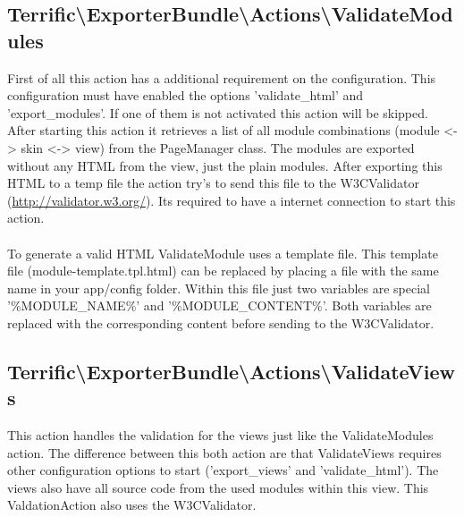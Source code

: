 \noindent \begin{minipage}{\textwidth}
\vspace{1.5em}
\hypertarget{sec-Actions-ValidateModules}{\subsection{Terrific\textnormal{\textbackslash}ExporterBundle\textnormal{\textbackslash}Actions\textnormal{\textbackslash}ValidateModules}}
First of all this action has a additional requirement on the configuration. This configuration must have enabled the options 'validate\_html' and 'export\_modules'. If one of them is not activated this action will be skipped. After starting this action it retrieves a list of all module combinations (module <-> skin <-> view) from the PageManager class. The modules are exported without any HTML from the view, just the plain modules. After exporting this HTML to a temp file the action try's to send this file to the W3CValidator (\url{http://validator.w3.org/}). Its required to have a internet connection to start this action. \\
\\
To generate a valid HTML ValidateModule uses a template file. This template file (module-template.tpl.html) can be replaced by placing a file with the same name in your app/config folder. Within this file just two variables are special \mbox{'\%MODULE\_NAME\%'} and \mbox{'\%MODULE\_CONTENT\%'}. Both variables are replaced with the corresponding content before sending to the W3CValidator.
\end{minipage}

\noindent \begin{minipage}{\textwidth}
\vspace{1.5em}
\hypertarget{sec-Actions-ValidateViews}{\subsection{Terrific\textnormal{\textbackslash}ExporterBundle\textnormal{\textbackslash}Actions\textnormal{\textbackslash}ValidateViews}}
This action handles the validation for the views just like the ValidateModules action. The difference between this both action are that ValidateViews requires other configuration options to start ('export\_views' and 'validate\_html'). The views also have all source code from the used modules within this view. This ValdationAction also uses the W3CValidator.
\end{minipage}

